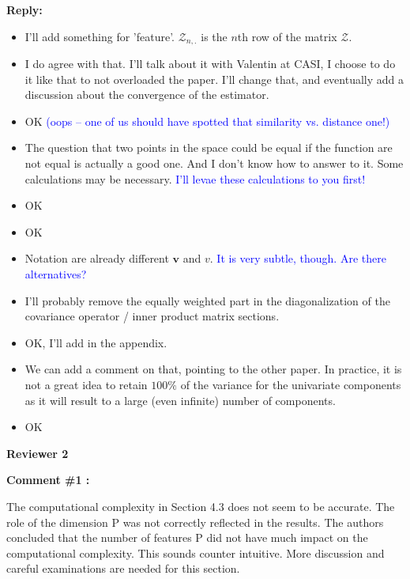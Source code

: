 \documentclass[11pt]{article}
\begin{document}
\medskip

\normalfont

\textbf{Reply:}

\begin{itemize}
  \item I'll add something for 'feature'. $\mathcal{Z}_{n,.}$ is the $n$th row of the matrix $\mathcal{Z}$.
  \item I do agree with that. I'll talk about it with Valentin at CASI, I choose to do it like that to not overloaded the paper. I'll change that, and eventually add a discussion about the convergence of the estimator.
  \item OK \textcolor{blue}{(oops – one of us should have spotted that similarity vs. distance one!)}
  \item The question that two points in the space could be equal if the function are not equal is actually a good one. And I don't know how to answer to it. Some calculations may be necessary. \textcolor{blue}{I’ll levae these calculations to you first!}
  \item OK
  \item OK
  \item Notation are already different $\boldsymbol{v}$ and $v$. \textcolor{blue}{It is very subtle, though. Are there alternatives?}
  \item I'll probably remove the equally weighted part in the diagonalization of the covariance operator / inner product matrix sections.
  \item OK, I'll add in the appendix.
  \item We can add a comment on that, pointing to the other paper. In practice, it is not a great idea to retain $100\%$ of the variance for the univariate components as it will result to a large (even infinite) number of components. 
  \item OK  
\end{itemize}

\vspace*{1cm}


{\large \textbf{Reviewer 2} }


\bigskip

\itshape


\textbf{Comment \#1 :}

The computational complexity in Section 4.3 does not seem to be accurate. The role of the dimension P was not correctly reflected in the results. The authors concluded that the number of features P did not have much impact on the computational complexity. This sounds counter intuitive. More discussion and careful examinations are needed for this section.
\end{document}
